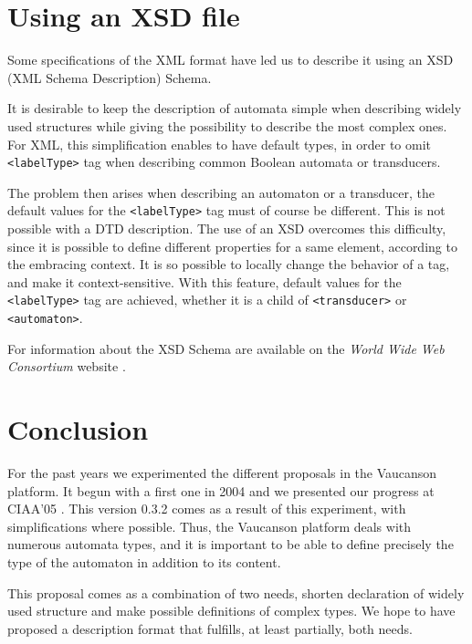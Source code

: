 \documentclass[a4paper]{article}
\newcommand{\Vauc}{{\sc Vaucanson}\xspace}
\newcommand{\xtag}[1]{\texttt{<#1>}}
\begin{document}
\section{Using an XSD file}

Some specifications of the XML format have led us to describe it using an XSD
(XML Schema Description) Schema.

It is desirable to keep the description of automata simple when
describing widely used structures while giving the possibility to
describe the most complex ones. For XML, this simplification enables
to have default types, in order to omit \xtag{labelType} tag when describing
common Boolean automata or transducers.

The problem then arises when describing an automaton or a transducer,
the default values for the \xtag{labelType} tag must of course be different.
This is not possible with a DTD description.  The use of an XSD
overcomes this difficulty, since it is possible to define different
properties for a same element, according to the embracing context. It
is so possible to locally change the behavior of a tag, and make it
context-sensitive. With this feature, default values for the
\xtag{labelType} tag are achieved, whether it is a child of
\xtag{transducer} or \xtag{automaton}.

For information about the XSD Schema are available on the
\textit{World Wide Web Consortium} website \cite{w3c.www}.

\section{Conclusion}

For the past years we experimented the different proposals in the
\Vauc platform. It begun with a first one in 2004 \cite{vaucanson.04.techrep}
and we presented our progress at CIAA'05 \cite{claveirole.05.ciaa}.
This version 0.3.2 comes as a result of this experiment, with
simplifications where possible. Thus, the \Vauc platform deals
with numerous automata types, and it is important to be able to define
precisely the type of the automaton in addition to its content.

This proposal comes as a combination of two needs, shorten declaration
of widely used structure and make possible definitions of complex
types. We hope to have proposed a description format that fulfills, at
least partially, both needs.

\nocite{lombardy.04.tcs}
\nocite{claveirole.05.ciaa}
\nocite{vaucanson.04.techrep}
\nocite{vaucanson.www.xml}
\nocite{vaucanson.www.xsd}
\nocite{w3c.www}




\end{document}

